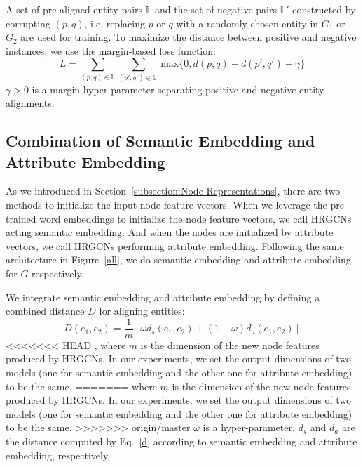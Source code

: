 	A set of pre-aligned entity pairs $\mathbb{L}$ and the set of negative pairs $\mathbb{L'}$  constructed by corrupting $(p, q)$, i.e. replacing $p$ or $q$ with a randomly chosen entity in $G_1$ or $G_2$ are used for training. To maximize the distance between positive and negative instances, we use the margin-based loss function:
	\begin{equation}
	L=\sum\limits_{(p,q)\in \mathbb{L}}\sum\limits_{(p',q')\in \mathbb{L'}}\mathrm{max}\{0,d(p,q)-d(p',q')+\gamma\}
	\end{equation}
	$\gamma > 0$ is a margin hyper-parameter separating positive and negative entity alignments.
	
	\subsection{Combination of Semantic Embedding and Attribute Embedding}
	As we introduced in Section~\ref{subsection:Node Representations}, there are two methods to initialize the input node feature vectors.
	When we leverage the pre-trained word embeddings to initialize the node feature vectors, we call HRGCNs acting semantic embedding.
	And when the nodes are initialized by attribute vectors, we call HRGCNs performing attribute embedding.
	Following the same architecture in Figure~\ref{all}, we do semantic embedding and attribute embedding for $G$ respectively.
	
	We integrate semantic embedding and attribute embedding by defining a combined distance $D$ for aligning entities:
	\begin{equation}
		D(e_1,e_2)=\frac{1}{m}[\omega d_s(e_1,e_2)+(1-\omega)d_a(e_1,e_2)]
	\end{equation}
<<<<<<< HEAD
	, where $m$ is the dimension of the new node features produced by HRGCNs.
	In our experiments, we set the output dimensions of two models (one for semantic embedding and the other one for attribute embedding) to be the same.
=======
	where $m$ is the dimension of the new node features produced by HRGCNs.
	In our experiments, we set the output dimensions of two models (one for semantic embedding and the other one for attribute embedding) to be the same.
>>>>>>> origin/master
	$\omega$ is a hyper-parameter. $d_s$ and $d_a$ are the distance computed by Eq.~\ref{d} according to semantic embedding and attribute embedding, respectively.
	
